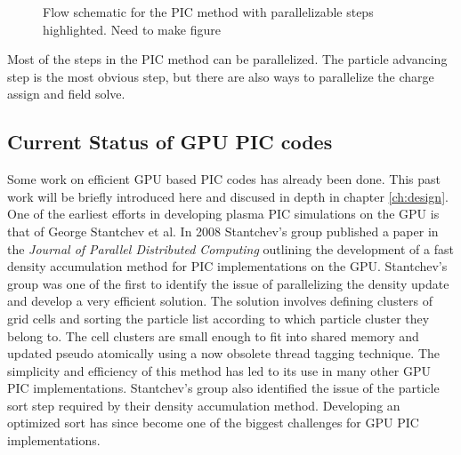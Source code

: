 \begin{figure}
\begin{center}

\end{center}
\caption{Flow schematic for the PIC method with parallelizable steps highlighted. Need to make figure}
\label{fig:pic_flowchart_parallel}
\end{figure}

Most of the steps in the PIC method can be parallelized. The particle advancing step is the most obvious step, but there are also ways to parallelize the charge assign and field solve. 

		\subsection{Current Status of GPU PIC codes}

						Some work on efficient GPU based PIC codes has already been done. This past work will be briefly introduced here and discused in depth in chapter \ref{ch:design}. One of the earliest efforts in developing plasma PIC simulations on the GPU is that of George Stantchev et al. In 2008 Stantchev's group published a paper in the \emph{Journal of Parallel Distributed Computing} outlining the development of a fast density accumulation method for PIC implementations on the GPU. Stantchev's group was one of the first to identify the issue of parallelizing the density update and develop a very efficient solution. The solution involves defining clusters of grid cells and sorting the particle list according to which particle cluster they belong to. The cell clusters are small enough to fit into shared memory and updated pseudo atomically using a now obsolete thread tagging technique. The simplicity and efficiency of this method has led to its use in many other GPU PIC implementations. Stantchev's group also identified the issue of the particle sort step required by their density accumulation method. Developing an optimized sort has since become one of the biggest challenges for GPU PIC implementations. \cite{Stantchev2008}

